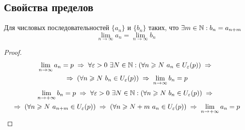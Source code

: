 \subsection{Свойства пределов}
\begin{theorem}
    Для числовых последовательностей $\{ a_n \}$ и $\{ b_n \}$ таких, что $ \exists m \in \mathbb{N} : b_n = a_{n + m}$
    \[ \lim_{n \to \infty} a_n = \lim_{n \to \infty} b_n \]
\end{theorem}
\begin{proof}
    \begin{multline*}
        \lim_{n \to \infty} a_n = p \thus
        \forall \epsilon > 0 \ \exists N \in \N: (\forall n \ge N\ a_n \in U_\epsilon(p)) \thus \\
        \thus (\forall n \ge N\ b_n \in U_\epsilon(p)) \thus
        \lim_{n \to \infty} b_n = p
    \end{multline*}
    \begin{multline*}
        \limpinf b_n = p \thus
        \forall \epsilon > 0 \ \exists N \in \N: (\forall n \ge N\ b_n \in U_\epsilon(p)) \thus \\
        \thus (\forall n \ge N\ a_{n + m} \in U_\epsilon(p)) \thus
        (\forall n \ge N + m \ a_{n} \in U_\epsilon(p)) \thus
        \limpinf a_n = p
    \end{multline*}
\end{proof}

